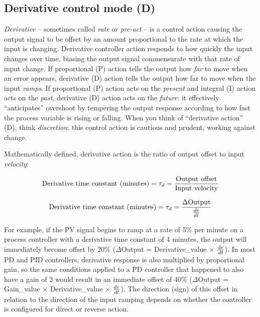 \vskip 10pt





\filbreak
\subsection{Derivative control mode (D)}

\textit{Derivative} -- sometimes called \textit{rate} or \textit{pre-act} -- is a control action causing the output signal to be offset by an amount proportional to the rate at which the input is changing.  Derivative controller action responds to how quickly the input changes over time, biasing the output signal commensurate with that rate of input change.  If proportional (P) action tells the output how \textit{far} to move when an error appears, derivative (D) action tells the output how far to move when the input \textit{ramps}.  If proportional (P) action acts on the \textit{present} and integral (I) action acts on the \textit{past}, derivative (D) action acts on the \textit{future}: it effectively ``anticipates'' overshoot by tempering the output response according to how fast the process variable is rising or falling.  When you think of ``derivative action'' (D), think \textit{discretion}: this control action is cautious and prudent, working against change.

\vskip 10pt

Mathematically defined, derivative action is the ratio of output offset to input \textit{velocity}:       

$$\hbox{Derivative time constant (minutes)} = \tau_d = {\hbox{Output offset} \over \hbox{Input velocity}}$$

$$\hbox{Derivative time constant (minutes)} = \tau_d = {\Delta \hbox{Output} \over {de \over dt}}$$

For example, if the PV signal begins to ramp at a rate of 5\% per minute on a process controller with a derivative time constant of 4 minutes, the output will immediately become offset by 20\% ($\Delta$Output = Derivative\_value $\times$ $de \over dt$).  In most PD and PID controllers, derivative response is also multiplied by proportional gain, so the same conditions applied to a PD controller that happened to also have a gain of 2 would result in an immediate offset of 40\% ($\Delta$Output = Gain\_value $\times$ Derivative\_value $\times$ $de \over dt$).  The direction (sign) of this offset in relation to the direction of the input ramping depends on whether the controller is configured for direct or reverse action.


